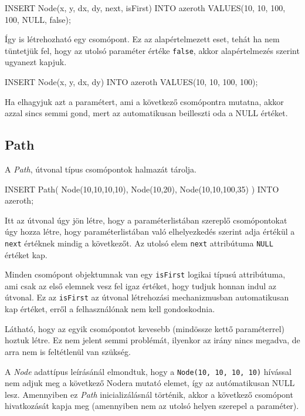 \begin{sql}
INSERT Node(x, y, dx, dy, next, isFirst) INTO 
azeroth VALUES(10, 10, 100, 100, NULL, false);
\end{sql}

Így is létrehozható egy csomópont. Ez az alapértelmezett eset, tehát ha nem tüntetjük fel, hogy az utolsó paraméter értéke \texttt{false}, akkor alapértelmezés szerint ugyanezt kapjuk.


\begin{sql}
INSERT Node(x, y, dx, dy) INTO azeroth VALUES(10, 10, 100, 100);
\end{sql}
Ha elhagyjuk azt a paramétert, ami a következő csomópontra mutatna, akkor azzal sincs semmi gond, mert az automatikusan beilleszti oda a NULL értéket.

\subsection{Path}

A \textit{Path}, útvonal típus csomópontok halmazát tárolja.

\begin{sql}
INSERT Path(
    Node(10,10,10,10),
    Node(10,20),
    Node(10,10,100,35)
) INTO azeroth;
\end{sql}

Itt az útvonal úgy jön létre, hogy a paraméterlistában szereplő csomópontokat úgy hozza létre, hogy paraméterlistában való elhelyezkedés szerint adja értékül a \texttt{next} értéknek mindig a következőt. Az utolsó elem \texttt{next} attribútuma \texttt{NULL} értéket kap.

Minden csomópont objektumnak van egy \texttt{isFirst} logikai típusú attribútuma, ami csak az első elemnek vesz fel igaz értéket, hogy tudjuk honnan indul az útvonal. Ez az \texttt{isFirst} az útvonal létrehozási mechanizmusban automatikusan kap értéket, erről a felhasználónak nem kell gondoskodnia.

Látható, hogy az egyik csomópontot kevesebb (mindössze kettő paraméterrel) hoztuk létre. Ez nem jelent semmi problémát, ilyenkor az irány nincs megadva, de arra nem is feltétlenül van szükség.

A \textit{Node} adattípus leírásánál elmondtuk, hogy a \texttt{Node(10, 10, 10, 10)} hívással nem adjuk meg a következő Nodera mutató elemet, így az autómatikusan NULL lesz. Amennyiben ez  \textit{Path} inicializálásnál történik, akkor a következő csomópont hivatkozását kapja meg (amennyiben nem az utolsó helyen szerepel a paraméter).


